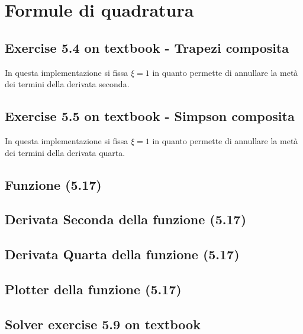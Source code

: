 \section{Formule di quadratura}

\subsection{Exercise 5.4 on textbook - Trapezi composita}
\label{subsec:exercise54}
 
In questa implementazione si fissa $\xi = 1$ in quanto permette di annullare la
met\`a dei termini della derivata seconda.

\subsection{Exercise 5.5 on textbook - Simpson composita}
\label{subsec:exercise55}

In questa implementazione si fissa $\xi = 1$ in quanto permette di annullare la
met\`a dei termini della derivata quarta.

\subsection{Funzione (5.17)}
\label{subsec:function517} 


\subsection{Derivata Seconda della funzione (5.17)}
\label{subsec:secondDer517}


\subsection{Derivata Quarta della funzione (5.17)}
\label{subsec:fourthDer517}


\subsection{Plotter della funzione (5.17)}
\label{subsec:functionPlotter517}


\subsection{Solver exercise 5.9 on textbook}
\label{subsec:exercise59solver}


